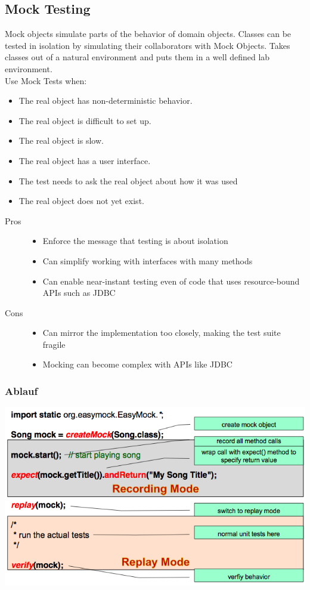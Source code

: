 \documentclass[a4paper,10pt]{article}
\begin{document}
\subsection{Mock Testing}
Mock objects simulate parts of the behavior of domain objects. Classes can be tested in isolation by simulating their collaborators with Mock Objects. Takes classes out of a natural environment and puts them in a well defined lab environment. \\
Use Mock Tests when:
\begin{itemize}
	\item The real object has non-deterministic behavior.
	\item The real object is difficult to set up.
	\item The real object is slow.
	\item The real object has a user interface.
	\item The test needs to ask the real object about how it was used
	\item The real object does not yet exist.
\end{itemize}
\begin{description}
	\item[Pros] \hfill
		\begin{itemize}
			\item Enforce the message that testing is about isolation
			\item Can simplify working with interfaces with many methods
			\item Can enable near-instant testing even of code that uses resource-bound APIs such as JDBC
		\end{itemize}
	\item[Cons] \hfill
		\begin{itemize}
			\item Can mirror the implementation too closely, making the test suite fragile	
			\item Mocking can become complex with APIs like JDBC
		\end{itemize}
\end{description}

\subsubsection{Ablauf}
\includegraphics[scale=0.6]{easymock.png}
\end{document}
